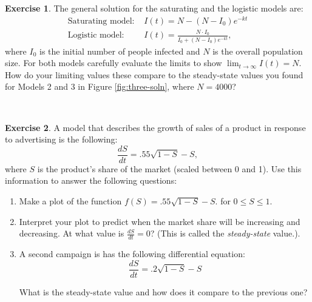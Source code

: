 \documentclass[
]{book}
\theoremstyle{definition}
\theoremstyle{definition}
\theoremstyle{definition}
\newtheorem{exercise}{Exercise}[chapter]
\theoremstyle{remark}
\begin{document}
\begin{exercise}
\protect\hypertarget{exr:unnamed-chunk-5}{}{\label{exr:unnamed-chunk-5} }The general solution for the saturating and the logistic models are:
\begin{align*}
\mbox{Saturating model: } & I(t) = N-(N-I_{0})e^{-kt} \\
\mbox{Logistic model: } &  I(t) = \frac{N \cdot I_{0} }{I_{0}+(N-I_{0})e^{-kt}},
\end{align*}
where \(I_{0}\) is the initial number of people infected and \(N\) is the overall population size. For both models carefully evaluate the limits to show \(\lim_{t \rightarrow \infty} I(t)=N\). How do your limiting values these compare to the steady-state values you found for Models 2 and 3 in Figure \ref{fig:three-soln}, where \(N=4000\)?
\end{exercise}
~

\begin{exercise}
\protect\hypertarget{exr:unnamed-chunk-6}{}{\label{exr:unnamed-chunk-6} }A model that describes the growth of sales of a product in response to advertising is the following:
\[\frac{dS}{dt} = .55\sqrt{1-S}-S, \]
where \(S\) is the product's share of the market (scaled between 0 and 1). Use this information to answer the following questions:

\begin{enumerate}[label=\alph*.]
  \item Make a plot of the function $f(S)=.55\sqrt{1-S}-S$. for $0 \leq S \leq 1$.
  \item Interpret your plot to predict when the market share will be increasing and decreasing.  At what value is $\displaystyle \frac{dS}{dt}=0$?  (This is called the \emph{steady-state} value.).
  \item  A second campaign is has the following differential equation:
  $$\frac{dS}{dt} = .2\sqrt{1-S}-S $$

What is the steady-state value and how does it compare to the previous one?
\end{enumerate}
\end{exercise}

~
\end{document}
